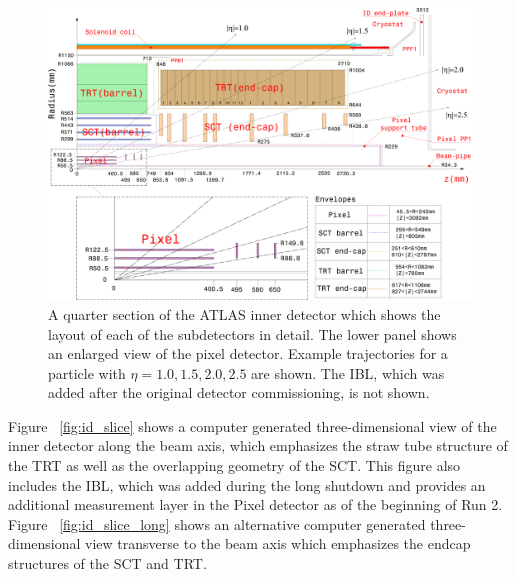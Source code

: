 \begin{figure}[hbtp]
\includegraphics[width=\fullfig]{figures/id_detail_schematic.pdf}
\caption{A quarter section of the ATLAS inner detector which shows the layout of each of the subdetectors in detail. The lower panel shows an enlarged view of the pixel detector. Example trajectories for a particle with $\eta = 1.0, 1.5, 2.0, 2.5$ are shown. The \ac{IBL}, which was added after the original detector commissioning, is not shown.}
\label{fig:id_detail_schematic}
\end{figure}

Figure ~\ref{fig:id_slice} shows a computer generated three-dimensional view of the inner detector along the beam axis, which emphasizes the straw tube structure of the \ac{TRT} as well as the overlapping geometry of the \ac{SCT}.
This figure also includes the \ac{IBL}, which was added during the long shutdown and provides an additional measurement layer in the Pixel detector as of the beginning of Run 2. 
Figure ~\ref{fig:id_slice_long} shows an alternative computer generated three-dimensional view transverse to the beam axis which emphasizes the endcap structures of the \ac{SCT} and \ac{TRT}. 

